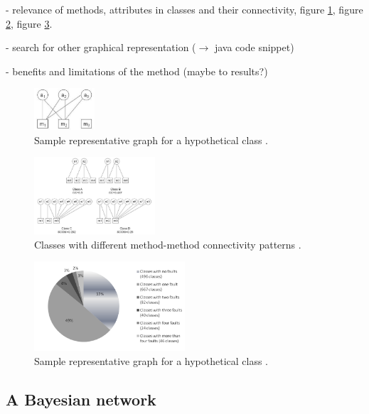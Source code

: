 - relevance of methods, attributes in classes and their connectivity, figure \ref{fig1}, figure \ref{fig2}, figure \ref{fig3}.

- search for other graphical representation ($\rightarrow$ java code snippet)

- benefits and limitations of the method (maybe to results?)


\begin{figure}[htbp]
	\centerline{\includegraphics[width=0.2\textwidth]{pictures/am.png}}
	\caption{Sample representative graph for a hypothetical class \cite{b3al2012fault}.}
	\label{fig1}
\end{figure}

\begin{figure}[htbp]
	\centerline{\includegraphics[width=0.4\textwidth]{pictures/am2.png}}
	\caption{Classes with different method-method connectivity patterns \cite{b3al2012fault}.}
	\label{fig2}
\end{figure}

\begin{figure}[htbp]
	\centerline{\includegraphics[width=0.5\textwidth]{pictures/circle.png}}
	\caption{Sample representative graph for a hypothetical class \cite{b3al2012fault}.}
	\label{fig3}
\end{figure}


\subsection{A Bayesian network}

